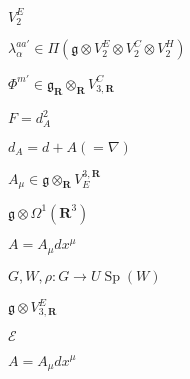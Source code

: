 \begin{preview}
\setcounter{equation}{0}%
\( V_2^E \)
\end{preview}

\begin{preview}
\setcounter{equation}{0}%
\( \lambda_{\alpha}^{a a'}\in \Pi (\mathfrak{g}  \otimes  V_2^E \otimes  V_2^C \otimes  V_2^H) \)
\end{preview}

\begin{preview}
\setcounter{equation}{0}%
\( \Phi^{m'} \in \mathfrak{g}_{\mathbf{R}} \otimes _{\mathbf{R}} V_{3, \mathbf{R}}^C  \)
\end{preview}

\begin{preview}
\setcounter{equation}{0}%
\( F = d^2_A \)
\end{preview}

\begin{preview}
\setcounter{equation}{0}%
\( d_A = d + A ( = \nabla) \)
\end{preview}

\begin{preview}
\setcounter{equation}{0}%
\( A_{\mu} \in \mathfrak{g} \otimes _{\mathbf{R}} V_E^{3, \mathbf{R}} \)
\end{preview}

\begin{preview}
\setcounter{equation}{0}%
\( \mathfrak{g} \otimes  \Omega^1( \mathbf{R}^3) \)
\end{preview}

\begin{preview}
\setcounter{equation}{0}%
\( A = A_{\mu} dx^{\mu} \)
\end{preview}

\begin{preview}
\setcounter{equation}{0}%
\( G, W , \rho : G \to U \operatorname{Sp}(W) \)
\end{preview}

\begin{preview}
\setcounter{equation}{0}%
\( \mathfrak{g} \otimes V^E_{3, \mathbf{R}} \)
\end{preview}

\begin{preview}
\setcounter{equation}{0}%
\( \mathcal{E} \)
\end{preview}

\begin{preview}
\setcounter{equation}{0}%
\( A = A_{\mu}dx^{\mu} \)
\end{preview}

